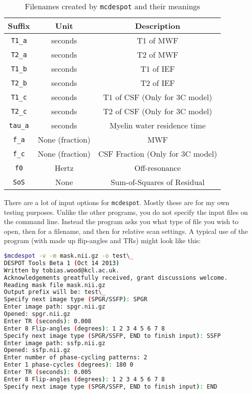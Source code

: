 \documentclass{report}
\begin{document}
\begin{table}\begin{center}
\begin{tabular}{c c c}
\hline
Suffix	& Unit	& Description\\
\hline
\texttt{T1\_a}	& seconds & T1 of MWF \\
\texttt{T2\_a}	& seconds & T2 of MWF \\
\texttt{T1\_b}	& seconds & T1 of IEF \\
\texttt{T2\_b}	& seconds & T2 of IEF \\
\texttt{T1\_c}	& seconds & T1 of CSF (Only for 3C model) \\
\texttt{T2\_c}	& seconds & T2 of CSF (Only for 3C model) \\
\texttt{tau\_a}	& seconds & Myelin water residence time \\
\texttt{f\_a}	& None (fraction) & MWF \\
\texttt{f\_c}	& None (fraction) & CSF Fraction (Only for 3C model) \\
\texttt{f0}		& Hertz   & Off-resonance \\
\texttt{SoS}	& None    & Sum-of-Squares of Residual \\
\hline
\end{tabular}
\caption{Filenames created by \texttt{mcdespot} and their meanings}
\label{mcdespotfilenames}
\end{center}\end{table}	

There are a lot of input options for \texttt{mcdespot}. Mostly these are for my own testing purposes. Unlike the other programs, you do not specify the input files on the command line. Instead the program asks you what type of file you wish to open, then for a filename, and then for relative scan settings. A typical use of the program (with made up flip-angles and TRs) might look like this:

\begin{lstlisting}[language=sh]
$mcdespot -v -m mask.nii.gz -o test\_
DESPOT Tools Beta 1 (Oct 14 2013)
Written by tobias.wood@kcl.ac.uk. 
Acknowledgements greatfully received, grant discussions welcome.
Reading mask file mask.nii.gz
Output prefix will be: test\_
Specify next image type (SPGR/SSFP): SPGR
Enter image path: spgr.nii.gz
Opened: spgr.nii.gz
Enter TR (seconds): 0.008
Enter 8 Flip-angles (degrees): 1 2 3 4 5 6 7 8
Specify next image type (SPGR/SSFP, END to finish input): SSFP
Enter image path: ssfp.nii.gz
Opened: ssfp.nii.gz
Enter number of phase-cycling patterns: 2
Enter 1 phase-cycles (degrees): 180 0
Enter TR (seconds): 0.005
Enter 8 Flip-angles (degrees): 1 2 3 4 5 6 7 8
Specify next image type (SPGR/SSFP, END to finish input): END
\end{lstlisting}
\end{document}
